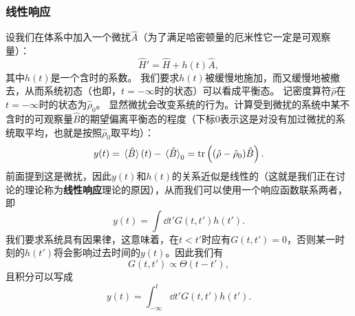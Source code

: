 \documentclass[hyperref, UTF8, a4paper]{ctexart}
\begin{document}
\subsubsection{线性响应}\label{sec:linear-response}

设我们在体系中加入一个微扰$\hat{A}$（为了满足哈密顿量的厄米性它一定是可观察量）：
\begin{equation}
    \hat{H}' = \hat{H} + h(t) \hat{A},
\end{equation}
其中$h(t)$是一个含时的系数。
我们要求$h(t)$被缓慢地施加，而又缓慢地被撤去，从而系统初态（也即，$t=-\infty$时的状态）可以看成平衡态。
记密度算符$\hat{\rho}$在$t=-\infty$时的状态为$\hat{\rho}_0$。
显然微扰会改变系统的行为。计算受到微扰的系统中某不含时的可观察量$\hat{B}$的期望偏离平衡态的程度（下标0表示这是对没有加过微扰的系统取平均，也就是按照$\hat{\rho}_0$取平均）：
\[
    y(t) = \expval*{\hat{B}}(t) - \expval*{\hat{B}}_0 = \trace\left((\hat{\rho} - \hat{\rho}_0)\hat{B}\right).
\]
前面提到这是微扰，因此$y(t)$和$h(t)$的关系近似是线性的（这就是我们正在讨论的理论称为\textbf{线性响应}理论的原因），从而我们可以使用一个响应函数联系两者，即
\[
    y(t) = \int \dd{t'} G(t, t') h(t').
\]
我们要求系统具有因果律，这意味着，在$t<t'$时应有$G(t,t')=0$，否则某一时刻的$h(t')$将会影响过去时间的$y(t)$。因此我们有
\[
    G(t,t') \propto \Theta(t-t'),
\]
且积分可以写成
\[
    y(t) = \int_{-\infty}^t \dd{t'} G(t, t') h(t').
\]
\end{document}

